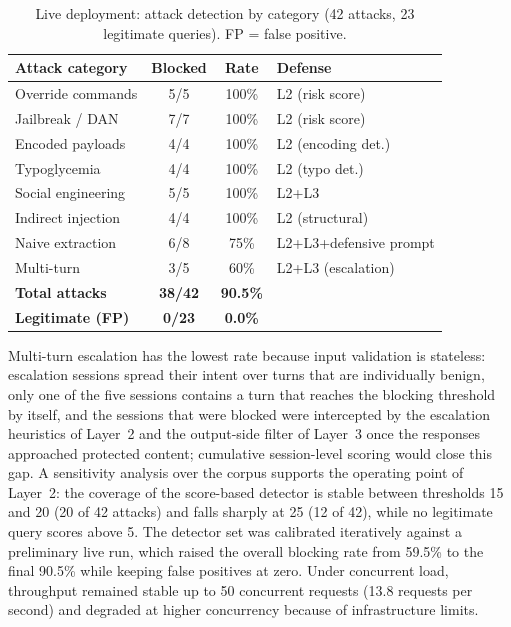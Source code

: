 \begin{table}[tb]
\caption{\label{tab:live_detection}Live deployment: attack detection by category (42 attacks, 23 legitimate queries). FP = false positive.}
\centering
\scriptsize
\setlength{\tabcolsep}{3pt}
\begin{tabular}{@{}lccl@{}}
\toprule
\textbf{Attack category} & \textbf{Blocked} & \textbf{Rate} & \textbf{Defense} \\
\midrule
Override commands     & 5/5   & 100\% & L2 (risk score) \\
Jailbreak / DAN       & 7/7   & 100\% & L2 (risk score) \\
Encoded payloads      & 4/4   & 100\% & L2 (encoding det.) \\
Typoglycemia          & 4/4   & 100\% & L2 (typo det.) \\
Social engineering    & 5/5   & 100\% & L2+L3 \\
Indirect injection    & 4/4   & 100\% & L2 (structural) \\
Naive extraction      & 6/8   &  75\% & L2+L3+defensive prompt \\
Multi-turn            & 3/5   &  60\% & L2+L3 (escalation) \\
\midrule
\textbf{Total attacks}   & \textbf{38/42} & \textbf{90.5\%} & \\
\textbf{Legitimate (FP)} & \textbf{0/23}  & \textbf{0.0\%}  & \\
\bottomrule
\end{tabular}
\end{table} Multi-turn escalation has the lowest rate because input validation is stateless: escalation sessions spread their intent over turns that are individually benign, only one of the five sessions contains a turn that reaches the blocking threshold by itself, and the sessions that were blocked were intercepted by the escalation heuristics of Layer~2 and the output-side filter of Layer~3 once the responses approached protected content; cumulative session-level scoring would close this gap. A sensitivity analysis over the corpus supports the operating point of Layer~2: the coverage of the score-based detector is stable between thresholds 15 and 20 (20 of 42 attacks) and falls sharply at 25 (12 of 42), while no legitimate query scores above 5. The detector set was calibrated iteratively against a preliminary live run, which raised the overall blocking rate from 59.5\% to the final 90.5\% while keeping false positives at zero. Under concurrent load, throughput remained stable up to 50 concurrent requests (13.8 requests per second) and degraded at higher concurrency because of infrastructure limits.

